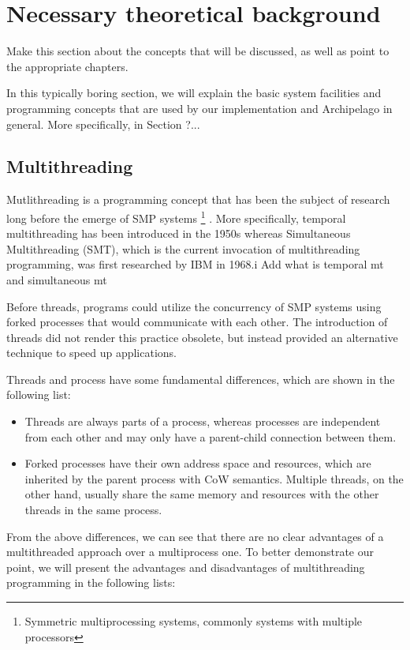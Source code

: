 \chapter{Necessary theoretical background}\label{ch:theory}

\fixme Make this section about the concepts that will be discussed, as well as 
point to the appropriate chapters.

In this typically boring section, we will explain the basic system facilities 
and programming concepts that are used by our implementation and Archipelago in 
general. More specifically, in Section ?...

\section{Multithreading}

Mutlithreading is a programming concept that has been the subject of research 
long before the emerge of SMP systems
\footnote{Symmetric multiprocessing systems, commonly systems with multiple 
	processors}
. More specifically, temporal multithreading has been introduced in the 1950s 
whereas Simultaneous Multithreading (SMT), which is the current invocation of 
multithreading programming, was first researched by IBM in 1968\cite{mt}.i 
\todo Add what is temporal mt and simultaneous mt

Before threads, programs could utilize the concurrency of SMP systems using 
forked processes that would communicate with each other. The introduction of 
threads did not render this practice obsolete, but instead provided an 
alternative technique to speed up applications.

Threads and process have some fundamental differences, which are shown in the 
following list:

\begin{itemize}
	\item Threads are always parts of a process, whereas processes are 
		independent from each other and may only have a parent-child connection 
		between them.
	\item Forked processes have their own address space and resources, which 
		are inherited by the parent process with CoW semantics.  Multiple 
		threads, on the other hand, usually share the same memory and resources 
		with the other threads in the same process.
\end{itemize}

From the above differences, we can see that there are no clear advantages of a 
multithreaded approach over a multiprocess one. To better demonstrate our 
point, we will present the advantages and disadvantages of multithreading 
programming in the following lists:

